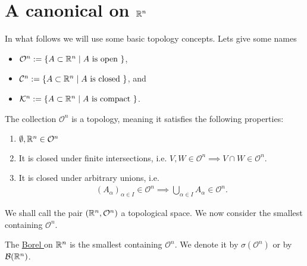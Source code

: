 \section{A canonical \siga on $\mathbb{R}^n$}

\newcommand{\OS}{\mathcal{O}}
\newcommand{\CS}{\mathcal{C}}
\newcommand{\KS}{\mathcal{K}}
In what follows we will use some basic topology concepts. Lets give some names
\begin{itemize}
	\item $\OS^n := \{A \subset \R^n \mid A \text{ is open }\}$,
	\item $\CS^n := \{A \subset \R^n \mid A \text{ is closed }\}$, and
	\item $\KS^n := \{A \subset \R^n \mid A \text{ is compact }\}$.
\end{itemize}

The collection $\OS^n$ is a topology, meaning it satisfies the following properties:
\begin{enumerate}
	\item $\emptyset, \R^n \in \OS^n$
	\item It is closed under finite intersections, i.e. $V, W \in \OS^n \implies V \cap W \in \OS^n$.
	\item It is closed under arbitrary unions, i.e.
	\begin{align*}
		(A_\alpha)_{\alpha \in I} \in \OS^n \implies \bigcup_{\alpha \in I} A_\alpha \in \OS^n.
	\end{align*}
\end{enumerate}

We shall call the pair $(\R^n, \OS^n)$ a topological space. We now consider the smallest \siga containing $\OS^n$.

\begin{dfn}
	The \underline{Borel \siga} on $\mathbb{R}^n$ is the smallest \siga containing $\OS^n$. We denote it by $\sigma(\OS^n)$ or by $\mathcal{B}(\mathbb{R}^n)$.
\end{dfn}

